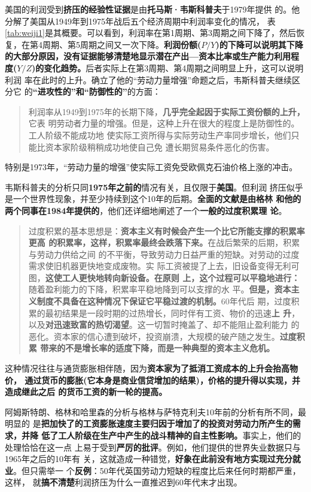 美国的利润受到\textbf{挤压的经验性证据}是由\textbf{托马斯·韦斯科普夫}于1979年提供
的。他分解了美国从1949年到1975年战后五个经济周期中利润率变化的情况，
表\ref{tab:weiji1}是其概要。可以看到，利润率在第1周期、第3周期之间下降了，然后恢
复，在第4周期、第5周期之间又一次下降。\textbf{利润份额($P/Y$)的下降可以说明其下降
  的大部分原因，没有证据能够清楚地显示潜在产出—资本比率或生产能力利用程
  度($Y/Z$)的变化趋势。}后者实际上在第3周期、第4周期之间明显上升，这可以说明利润
率在此时的上升。确立了他的“劳动力量增强”命题之后，韦斯科普夫继续区分它
的\textbf{“进攻性的”和“防御性的”}的方面：
\begin{quotation}
  利润率从1949到1975年的长期下降，\textbf{几乎完全起因于实际工资份额的上升，}它表
  明劳动者力量的增强。但是，这种上升在很大的程度上是防御性的。工人阶级不能成功地
  使实际工资所得与实际劳动生产率同步增长，他们只能比资本家阶级稍稍成功地使自己免
  遭长期贸易条件恶化的伤害。
\end{quotation}
特别是1973年，“劳动力量的增强”使实际工资免受欧佩克石油价格上涨的冲击。


韦斯科普夫的分析只同\textbf{1975年之前的}情况有关，且仅限于\textbf{美国}。但利润
挤压似乎是一个世界性现象，并至少持续到这个10年的后期。\textbf{全面的文献是由格林
  和他的两个同事在1984年提供的}，他们还详细地阐述了一个\textbf{一般的过度积累理
  论}。
\begin{quotation}
  过度积累的基本思想是：\textbf{资本主义有时候会产生一个比它所能支撑的积累率更高
    的积累率，这样，积累率最终会跌落下来。}在战后繁荣的后期，积累与劳动力供给之间
  的不平衡，导致劳动力日益严重的短缺。对劳动的过度需求使旧机器更快地变成废物。实
  际工资被提了上去，旧设备变得无利可图，\textbf{这使工人更快地转向新设备。在原则
    上，这个过程可以平稳地进行：}随着盈利能力的下降，积累率平稳地降到可以支撑的水
  平。\textbf{但是，资本主义制度不具备在这种情况下保证它平稳过渡的机制。}60年代后
  期，过度积累的最初结果是一段时期的过热增长，同时伴有工资、物价的迅速\textbf{上
    升}，以及\textbf{对迅速致富的热切渴望}。这一切暂时掩盖了、却不能阻止盈利能力
  的恶化。资本家的信心遭到破坏，投资崩溃，大规模的破产随之发生。\textbf{过度积累
    带来的不是增长率的适度下降，而是一种典型的资本主义危机。}
\end{quotation}
这种情况往往与通货膨胀相伴随，因为\textbf{资本家为了抵消工资成本的上升会抬高物价，
  通过货币的膨胀(它本身是商业信贷增加的结果)，价格的提升得以实现，并造成继此之后
  的货币工资的新一轮的提高。}

阿姆斯特朗、格林和哈里森的分析与格林与萨特克利夫10年前的分析有所不同，最明显的
是\textbf{把加快了的工资膨胀速度主要归因于增加了的投资对劳动力所产生的需求，并降
  低了工人阶级在生产中产生的战斗精神的自主性影响。}事实上，他们的处理恰恰在这一点
上易于受到\textbf{严厉的批评}。例如，他们提供的世界失业数据只与1965年之后的10年有
关，这就造成一种错觉，\textbf{好象在此前没有地方实现过充分就业}。但只需举一
个\textbf{反例}：50年代英国劳动力短缺的程度比后来任何时期都严重，这样，
就\textbf{搞不清楚}利润挤压为什么一直推迟到60年代末才出现。


